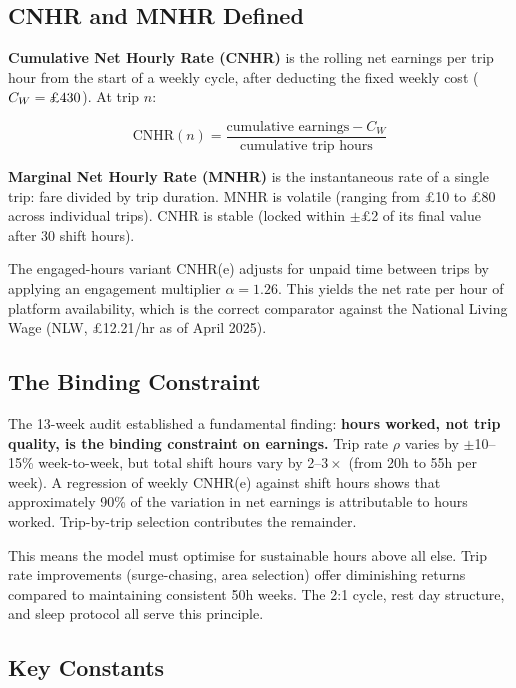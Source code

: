 \documentclass[a4paper,11pt]{article}
\begin{document}
\subsection{CNHR and MNHR Defined}

\textbf{Cumulative Net Hourly Rate (CNHR)} is the rolling net earnings per trip hour from the start of a weekly cycle, after deducting the fixed weekly cost ($C_W = \text{\pounds430}$). At trip $n$:

\begin{equation}
\text{CNHR}(n) = \frac{\text{cumulative earnings} - C_W}{\text{cumulative trip hours}}
\end{equation}

\textbf{Marginal Net Hourly Rate (MNHR)} is the instantaneous rate of a single trip: fare divided by trip duration. MNHR is volatile (ranging from \pounds10 to \pounds80 across individual trips). CNHR is stable (locked within $\pm$\pounds2 of its final value after 30 shift hours).

The engaged-hours variant CNHR(e) adjusts for unpaid time between trips by applying an engagement multiplier $\alpha = 1.26$. This yields the net rate per hour of platform availability, which is the correct comparator against the National Living Wage (NLW, \pounds12.21/hr as of April 2025).

\subsection{The Binding Constraint}

The 13-week audit established a fundamental finding: \textbf{hours worked, not trip quality, is the binding constraint on earnings.} Trip rate $\rho$ varies by $\pm$10--15\% week-to-week, but total shift hours vary by 2--$3\times$ (from 20h to 55h per week). A regression of weekly CNHR(e) against shift hours shows that approximately 90\% of the variation in net earnings is attributable to hours worked. Trip-by-trip selection contributes the remainder.

This means the model must optimise for sustainable hours above all else. Trip rate improvements (surge-chasing, area selection) offer diminishing returns compared to maintaining consistent 50h weeks. The 2:1 cycle, rest day structure, and sleep protocol all serve this principle.

\subsection{Key Constants}
\end{document}
